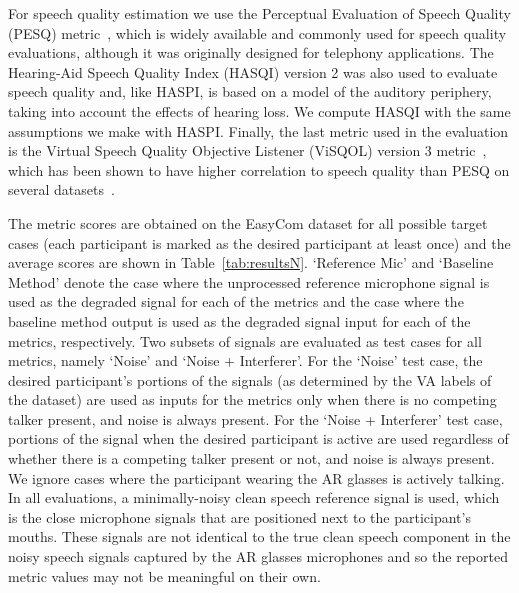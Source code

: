 \documentclass[journal]{IEEEtran}
\begin{document}
\begin{table*}[htb!]
\begin{center}
\begin{tabular}
{{For speech quality estimation we use the Perceptual Evaluation of Speech Quality (PESQ) metric~\cite{ITU_PESQ_2003}, which is widely available and commonly used for speech quality evaluations, although it was originally designed for telephony applications.
The Hearing-Aid Speech Quality Index (HASQI) version 2 was also used to evaluate speech quality and, like HASPI, is based on a model of the auditory periphery, taking into account the effects of hearing loss. 
We compute HASQI with the same assumptions we make with HASPI. 
Finally, the last metric used in the evaluation is the Virtual Speech Quality Objective Listener (ViSQOL) version 3 metric~\cite{chinen2020visqol}, which has been shown to have higher correlation to speech quality than PESQ on several datasets~\cite{hines2015visqol}.

The metric scores are obtained on the EasyCom dataset for all possible target cases (each participant is marked as the desired participant at least once) and the average scores are shown in Table~\ref{tab:resultsN}.
`Reference Mic' and `Baseline Method' denote the case where the unprocessed reference microphone signal is used as the degraded signal for each of the metrics and the case where the baseline method output is used as the degraded signal input for each of the metrics, respectively.
Two subsets of signals are evaluated as test cases for all metrics, namely `Noise' and `Noise + Interferer'.
For the `Noise' test case, the desired participant’s portions of the signals (as determined by the VA labels of the dataset) are used as inputs for the metrics only when there is no competing talker present, and noise is always present.
For the `Noise + Interferer' test case, portions of the signal when the desired participant is active are used regardless of whether there is a competing talker present or not, and noise is always present.
We ignore cases where the participant wearing the AR glasses is actively talking.
In all evaluations, a minimally-noisy clean speech reference signal is used, which is the close microphone signals that are positioned next to the participant's mouths. 
These signals are not identical to the true clean speech component in the noisy speech signals captured by the AR glasses microphones and so the reported metric values may not be meaningful on their own.

}}
\end{tabular}
\end{center}
\end{table*}
\end{document}
